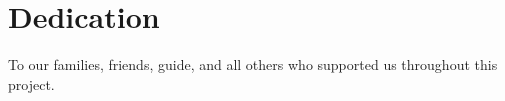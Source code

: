 \chapter*{Dedication}
\thispagestyle{empty}
\begin{center}
	\vfill
	To our families, friends, guide, and all others who supported us throughout this project.\\
	\vfill
\end{center}

